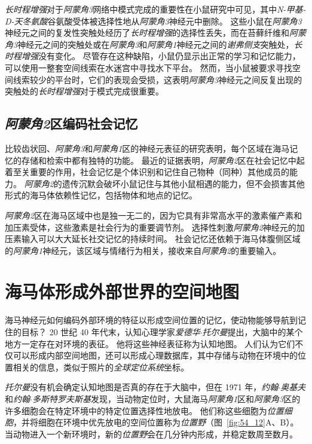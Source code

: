 \textit{长时程增强}对于\textit{阿蒙角3}网络中模式完成的重要性在小鼠研究中可见，其中\textit{N-甲基-D-天冬氨酸}谷氨酸受体被选择性地从\textit{阿蒙角3}神经元中删除。
这些小鼠在\textit{阿蒙角3}神经元之间的复发性突触处经历了\textit{长时程增强}的选择性丢失，而在苔藓纤维和\textit{阿蒙角3}神经元之间的突触处或在\textit{阿蒙角3}和\textit{阿蒙角1}神经元之间的\textit{谢弗侧支}突触处，\textit{长时程增强}没有变化。
尽管存在这种缺陷，小鼠仍显示出正常的学习和记忆能力，可以使用一整套空间线索在水迷宫中寻找水下平台。
然而，当小鼠被要求寻找空间线索较少的平台时，它们的表现会受损，这表明\textit{阿蒙角3}神经元之间反复出现的突触处的\textit{长时程增强}对于模式完成很重要。



\subsection{\textit{阿蒙角2}区编码社会记忆}

比较齿状回、\textit{阿蒙角3}和\textit{阿蒙角1}区的神经元表征的研究表明，每个区域在海马记忆的存储和检索中都有独特的功能。
最近的证据表明，\textit{阿蒙角2}区在社会记忆中起着至关重要的作用，社会记忆是个体识别和记住自己物种（同种）其他成员的能力。
\textit{阿蒙角2}的遗传沉默会破坏小鼠记住与其他小鼠相遇的能力，但不会损害其他形式的海马体依赖性记忆，包括物体和地点的记忆。


\textit{阿蒙角2}区在海马区域中也是独一无二的，因为它具有非常高水平的激素催产素和加压素受体，这些激素是社会行为的重要调节剂。
选择性刺激\textit{阿蒙角2}神经元的加压素输入可以大大延长社交记忆的持续时间。
社会记忆还依赖于海马体腹侧区域的\textit{阿蒙角1}神经元，该区域与情绪行为相关，接收来自\textit{阿蒙角2}的重要输入。



\section{海马体形成外部世界的空间地图}

海马神经元如何编码外部环境的特征以形成空间位置的记忆，使动物能够导航到记住的目标？
20 世纪 40 年代末，认知心理学家\textit{爱德华$\cdot$托尔曼}提出，大脑中的某个地方一定存在对环境的表征。
他将这些神经表征称为认知地图。
人们认为它们不仅可以形成内部空间地图，还可以形成心理数据库，其中存储与动物在环境中的位置相关的信息，类似于照片的\textit{全球定位系统}坐标。


\textit{托尔曼}没有机会确定认知地图是否真的存在于大脑中，但在 1971 年，\textit{约翰$\cdot$奥基夫}和\textit{约翰$\cdot$多斯特罗夫斯基}发现，当动物定位时，大鼠海马\textit{阿蒙角1}区和\textit{阿蒙角3}区的许多细胞会在特定环境中的特定位置选择性地放电。
他们称这些细胞为\textit{位置细胞}，并将细胞在环境中优先放电的空间位置称为\textit{位置野}（图~\ref{fig:54_12}A、B）。
当动物进入一个新环境时，新的\textit{位置野}会在几分钟内形成，并稳定数周至数月。


